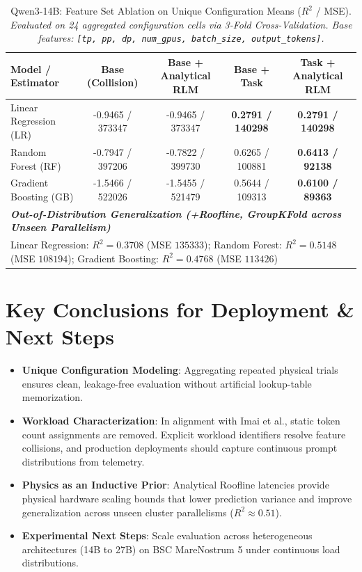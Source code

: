 \documentclass[10pt,a4paper]{article}
\begin{document}
\vspace{-0.8em}
\begin{table}[htbp]
\centering
\scriptsize
\renewcommand{\arraystretch}{0.85}
\setlength{\tabcolsep}{3.5pt}
\caption{Qwen3-14B: Feature Set Ablation on Unique Configuration Means ($R^2$ / MSE). \\
\textit{Evaluated on 24 aggregated configuration cells via 3-Fold Cross-Validation. Base features: \texttt{[tp, pp, dp, num\_gpus, batch\_size, output\_tokens]}.}}
\label{tab:takeaway}
\begin{tabular}{l cccc}
\toprule
\textbf{Model / Estimator} & \textbf{Base (Collision)} & \textbf{Base + Analytical RLM} & \textbf{Base + Task} & \textbf{Task + Analytical RLM} \\
\midrule
Linear Regression (LR)          & -0.9465 / 373347 & -0.9465 / 373347 & \textbf{0.2791 / 140298} & \textbf{0.2791 / 140298} \\
Random Forest (RF)              & -0.7947 / 397206 & -0.7822 / 399730 & 0.6265 / 100881          & \textbf{0.6413 / 92138}  \\
Gradient Boosting (GB)          & -1.5466 / 522026 & -1.5455 / 521479 & 0.5644 / 109313          & \textbf{0.6100 / 89363}  \\
\midrule
\multicolumn{5}{l}{\textit{\textbf{Out-of-Distribution Generalization (+Roofline, GroupKFold across Unseen Parallelism)}}} \\
\multicolumn{5}{l}{Linear Regression: $R^2 = 0.3708$ (MSE $135333$); Random Forest: $R^2 = 0.5148$ (MSE $108194$); Gradient Boosting: $R^2 = 0.4768$ (MSE $113426$)} \\
\bottomrule
\end{tabular}
\end{table}

\vspace{-0.5em}
\section*{Key Conclusions for Deployment \& Next Steps}
\begin{itemize}
    \setlength\itemsep{0.02em}
    \item \textbf{Unique Configuration Modeling}: Aggregating repeated physical trials ensures clean, leakage-free evaluation without artificial lookup-table memorization.
    \item \textbf{Workload Characterization}: In alignment with Imai et al., static token count assignments are removed. Explicit workload identifiers resolve feature collisions, and production deployments should capture continuous prompt distributions from telemetry.
    \item \textbf{Physics as an Inductive Prior}: Analytical Roofline latencies provide physical hardware scaling bounds that lower prediction variance and improve generalization across unseen cluster parallelisms ($R^2 \approx 0.51$).
    \item \textbf{Experimental Next Steps}: Scale evaluation across heterogeneous architectures (14B to 27B) on BSC MareNostrum 5 under continuous load distributions.
\end{itemize}
\end{document}
